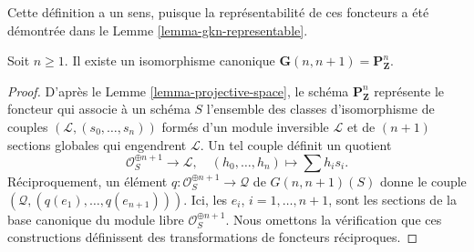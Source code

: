 \noindent
Cette définition a un sens, puisque la
représentabilité de ces foncteurs a
été démontrée dans le Lemme \ref{lemma-gkn-representable}.

\begin{lemma}
\label{lemma-projective-space-grassmannian}
Soit $n \geq 1$. Il existe un isomorphisme canonique
$\mathbf{G}(n, n + 1) = \mathbf{P}^n_\mathbf{Z}$.
\end{lemma}

\begin{proof}
D'après le Lemme \ref{lemma-projective-space}, le schéma
$\mathbf{P}^n_\mathbf{Z}$ représente le foncteur qui associe à un schéma
$S$ l'ensemble des classes d'isomorphisme de couples
$(\mathcal{L}, (s_0, \ldots, s_n))$ formés d'un module inversible
$\mathcal{L}$ et de $(n + 1)$ sections
globales qui engendrent $\mathcal{L}$.
Un tel couple définit un quotient
$$
\mathcal{O}_S^{\oplus n + 1} \longrightarrow \mathcal{L},\quad
(h_0, \ldots, h_n) \longmapsto \sum h_i s_i.
$$
Réciproquement, un élément
$q : \mathcal{O}_S^{\oplus n + 1} \to \mathcal{Q}$ de $G(n, n + 1)(S)$
donne le couple $(\mathcal{Q}, (q(e_1), \ldots, q(e_{n + 1})))$.
Ici, les $e_i$, $i = 1, \ldots, n + 1$, sont les sections de la base
canonique du module libre $\mathcal{O}_S^{\oplus n + 1}$.
Nous omettons la vérification que ces constructions définissent des
transformations de foncteurs réciproques.
\end{proof}








